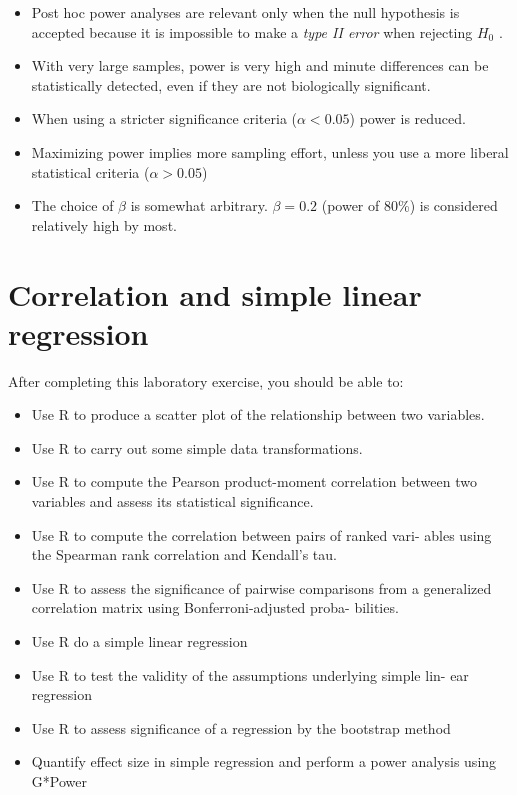 \documentclass[
  12pt,
]{book}
\providecommand{\tightlist}{%
  \setlength{\itemsep}{0pt}\setlength{\parskip}{0pt}}
\begin{document}
\begin{itemize}
\tightlist
\item
  Post hoc power analyses are relevant only when the null hypothesis is accepted because it is impossible to make a \emph{type II error} when rejecting \(H_0\) .
\item
  With very large samples, power is very high and minute differences can be statistically detected, even if they are not biologically significant.
\item
  When using a stricter significance criteria (\(\alpha < 0.05\)) power is reduced.
\item
  Maximizing power implies more sampling effort, unless you use a more liberal statistical criteria (\(\alpha > 0.05\))
\item
  The choice of \(\beta\) is somewhat arbitrary. \(\beta=0.2\) (power of 80\%) is considered relatively high by most.
\end{itemize}

\hypertarget{correlation-and-simple-linear-regression}{%
\chapter{Correlation and simple linear regression}\label{correlation-and-simple-linear-regression}}

After completing this laboratory exercise, you should be able to:

\begin{itemize}
\tightlist
\item
  Use R to produce a scatter plot of the relationship between two
  variables.
\item
  Use R to carry out some simple data transformations.
\item
  Use R to compute the Pearson product-moment correlation
  between two variables and assess its statistical significance.
\item
  Use R to compute the correlation between pairs of ranked vari-
  ables using the Spearman rank correlation and Kendall's tau.
\item
  Use R to assess the significance of pairwise comparisons from a
  generalized correlation matrix using Bonferroni-adjusted proba-
  bilities.
\item
  Use R do a simple linear regression
\item
  Use R to test the validity of the assumptions underlying simple lin-
  ear regression
\item
  Use R to assess significance of a regression by the bootstrap
  method
\item
  Quantify effect size in simple regression and perform a power
  analysis using G*Power
\end{itemize}
\end{document}
